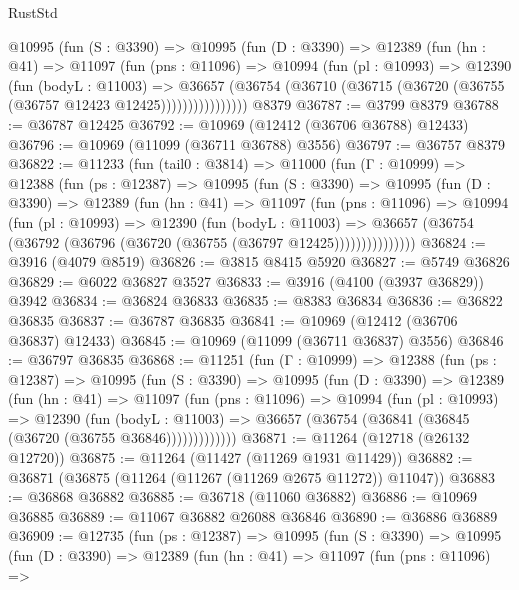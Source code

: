 \begin{lexlean}{RustStd}
\begin{coremodule}
          @10995
            (fun (S : @3390) =>
            @10995
              (fun (D : @3390) =>
              @12389
                (fun (hn : @41) =>
                @11097
                  (fun (pns : @11096) =>
                  @10994
                    (fun (pl : @10993) =>
                    @12390
                      (fun (bodyL : @11003) =>
                      @36657
                        (@36754
                          (@36710 (@36715 (@36720 (@36755 (@36757 @12423 @12425))))))))))))))))
    @8379
@36787 := @3799 @8379
@36788 := @36787 @12425
@36792 := @10969 (@12412 (@36706 @36788) @12433)
@36796 := @10969 (@11099 (@36711 @36788) @3556)
@36797 := @36757 @8379
@36822 := @11233
    (fun (tail0 : @3814) =>
    @11000
      (fun (Γ : @10999) =>
      @12388
        (fun (ps : @12387) =>
        @10995
          (fun (S : @3390) =>
          @10995
            (fun (D : @3390) =>
            @12389
              (fun (hn : @41) =>
              @11097
                (fun (pns : @11096) =>
                @10994
                  (fun (pl : @10993) =>
                  @12390
                    (fun (bodyL : @11003) =>
                    @36657 (@36754 (@36792 (@36796 (@36720 (@36755 (@36797 @12425)))))))))))))))
@36824 := @3916 (@4079 @8519)
@36826 := @3815 @8415 @5920
@36827 := @5749 @36826
@36829 := @6022 @36827 @3527
@36833 := @3916 (@4100 (@3937 @36829)) @3942
@36834 := @36824 @36833
@36835 := @8383 @36834
@36836 := @36822 @36835
@36837 := @36787 @36835
@36841 := @10969 (@12412 (@36706 @36837) @12433)
@36845 := @10969 (@11099 (@36711 @36837) @3556)
@36846 := @36797 @36835
@36868 := @11251
    (fun (Γ : @10999) =>
    @12388
      (fun (ps : @12387) =>
      @10995
        (fun (S : @3390) =>
        @10995
          (fun (D : @3390) =>
          @12389
            (fun (hn : @41) =>
            @11097
              (fun (pns : @11096) =>
              @10994
                (fun (pl : @10993) =>
                @12390
                  (fun (bodyL : @11003) =>
                  @36657 (@36754 (@36841 (@36845 (@36720 (@36755 @36846)))))))))))))
@36871 := @11264 (@12718 (@26132 @12720))
@36875 := @11264 (@11427 (@11269 @1931 @11429))
@36882 := @36871 (@36875 (@11264 (@11267 (@11269 @2675 @11272)) @11047))
@36883 := @36868 @36882
@36885 := @36718 (@11060 @36882)
@36886 := @10969 @36885
@36889 := @11067 @36882 @26088 @36846
@36890 := @36886 @36889
@36909 := @12735
    (fun (ps : @12387) =>
    @10995
      (fun (S : @3390) =>
      @10995
        (fun (D : @3390) =>
        @12389
          (fun (hn : @41) =>
          @11097
            (fun (pns : @11096) =>

\end{coremodule}
\end{lexlean}
